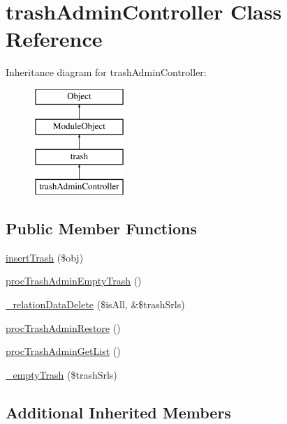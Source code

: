 \hypertarget{classtrashAdminController}{}\section{trash\+Admin\+Controller Class Reference}
\label{classtrashAdminController}
Inheritance diagram for trash\+Admin\+Controller\+:\begin{figure}[H]
\begin{center}
\leavevmode
\includegraphics[height=4.000000cm]{classtrashAdminController}
\end{center}
\end{figure}
\subsection*{Public Member Functions}
\begin{DoxyCompactItemize}
\item 
\hyperlink{classtrashAdminController_af1c07b97582130b96d72fa6d397d7740}{insert\+Trash} (\$obj)
\item 
\hyperlink{classtrashAdminController_a15977bd5e3c92b5b7b9218dee97a9ed0}{proc\+Trash\+Admin\+Empty\+Trash} ()
\item 
\hyperlink{classtrashAdminController_a6f402d0113009b914de8665786d95ae9}{\+\_\+relation\+Data\+Delete} (\$is\+All, \&\$trash\+Srls)
\item 
\hyperlink{classtrashAdminController_a5bd5aea6170e91d725b7f758480aba38}{proc\+Trash\+Admin\+Restore} ()
\item 
\hyperlink{classtrashAdminController_af522d8b4cd292cce44ea6b1cedfcf0c1}{proc\+Trash\+Admin\+Get\+List} ()
\item 
\hyperlink{classtrashAdminController_adaff8ae03021995e529e1c8f6510ff24}{\+\_\+empty\+Trash} (\$trash\+Srls)
\end{DoxyCompactItemize}
\subsection*{Additional Inherited Members}


